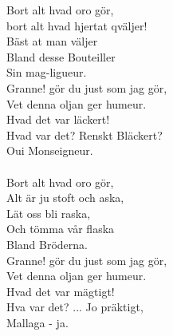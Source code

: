\vspace{10pt}
Bort alt hvad oro gör,\\
bort alt hvad hjertat qväljer!\\
Bäst at man väljer\\
Bland desse Bouteiller\\
Sin mag-ligueur.\\
\revrpt Granne! gör du just som jag gör,\\
Vet denna oljan ger humeur.\\
Hvad det var läckert!\\
Hvad var det? Renskt Bläckert?\\
	Oui Monseigneur.\rpt\\
\\
Bort alt hvad oro gör,\\
Alt är ju stoft och aska,\\
Lät oss bli raska,\\
Och tömma vår flaska\\
Bland Bröderna.\\
\revrpt Granne! gör du just som jag gör,\\
Vet denna oljan ger humeur.\\
Hvad det var mägtigt!\\
Hva var det? ... Jo präktigt,\\
	Mallaga - ja.\rpt
